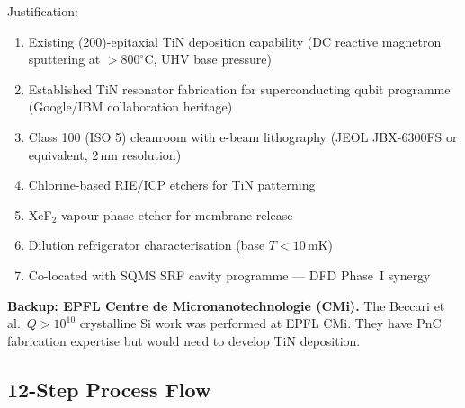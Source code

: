 \documentclass[11pt]{article}
\theoremstyle{remark}
\begin{document}
Justification:
\begin{enumerate}[nosep]
  \item Existing (200)-epitaxial TiN deposition capability (DC reactive
    magnetron sputtering at $> 800^\circ$C, UHV base pressure)
  \item Established TiN resonator fabrication for superconducting
    qubit programme (Google/IBM collaboration heritage)
  \item Class 100 (ISO 5) cleanroom with e-beam lithography (JEOL
    JBX-6300FS or equivalent, 2\,nm resolution)
  \item Chlorine-based RIE/ICP etchers for TiN patterning
  \item XeF$_2$ vapour-phase etcher for membrane release
  \item Dilution refrigerator characterisation (base $T < 10$\,mK)
  \item Co-located with SQMS SRF cavity programme --- DFD Phase~I
    synergy
\end{enumerate}

\textbf{Backup: EPFL Centre de Micro\-nanotechnologie (CMi).}
The Beccari et al.\ $Q > 10^{10}$ crystalline Si work was performed
at EPFL CMi. They have PnC fabrication expertise but would need to
develop TiN deposition.

\subsection{12-Step Process Flow}
\end{document}
